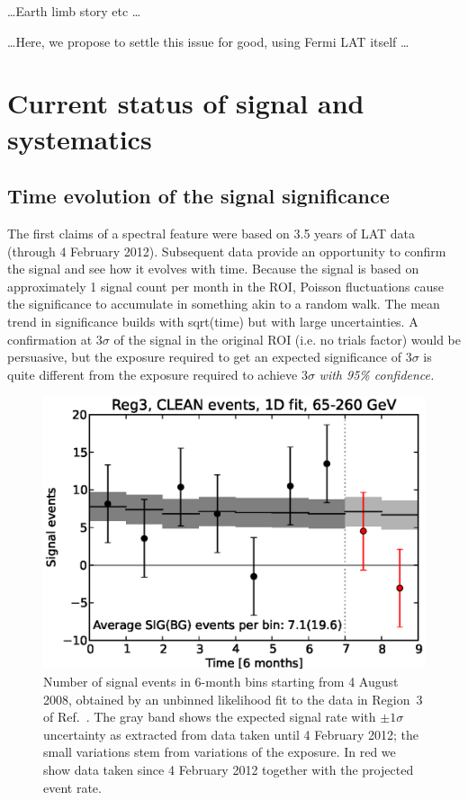 \documentclass[aps,prd,superscriptaddress,showpacs,nofootinbib,fixlfloat, 12pt]{revtex4-1}
\begin{document}

\dots Earth limb story etc \dots

\dots Here, we propose to settle this issue for good, using Fermi LAT itself
\dots

\section{Current status of signal and systematics}
\subsection{Time evolution of the signal significance}
The first claims of a spectral feature \citep{Bringmann:2012,Weniger:2012}
were based on 3.5 years of LAT data (through 4 February 2012).  Subsequent
data provide an opportunity to confirm the signal and see how it evolves with
time.  Because the signal is based on approximately 1 signal count per month
in the ROI, Poisson fluctuations cause the significance to accumulate in
something akin to a random walk.  The mean trend in significance builds with
sqrt(time) but with large uncertainties.  A confirmation at $3\sigma$ of the
signal in the original ROI (i.e. no trials factor) would be persuasive, but
the exposure required to get an expected significance of $3\sigma$ is quite
different from the exposure required to achieve $3\sigma$ \emph{with 95\%
  confidence.}



\begin{figure}[h]
  \begin{center}
    \includegraphics[width=0.60\linewidth]{plots/semester_fluxes.eps}
    \vspace{-0.5cm}
  \end{center}
  \caption{Number of signal events in 6-month bins starting from 4
    August 2008, obtained by an unbinned likelihood fit to the data in
    Region~3 of Ref.~\cite{Weniger:2012}. The gray band shows the expected
    signal rate with $\pm1\sigma$ uncertainty as extracted from data taken until
    4 February 2012; the small variations stem from variations of the
    exposure. In red we show data taken since 4 February 2012
    together with the projected event rate.}
  \label{fig:semester_fluxes}
\end{figure}
\end{document}
